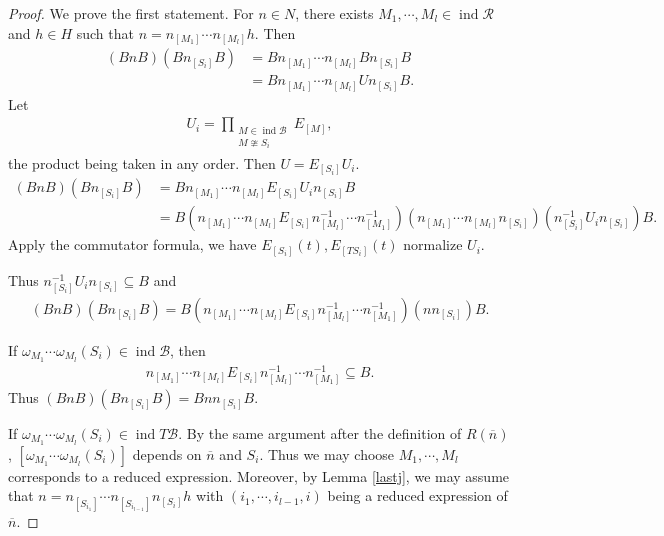 \documentclass[12pt]{amsart}
\begin{document}
\begin{proof}
    We prove the first statement.
    For $n\in N$, there exists $M_1,\cdots, M_l \in \operatorname{ind}\mathcal{R}$ and $h\in H$ such that $n=n_{[M_1]}\cdots n_{[M_l]}h$.
    Then 
    \begin{align*}
        (BnB)(Bn_{[S_i]}B) &= B n_{[M_1]}\cdots n_{[M_l]} Bn_{[S_i]}B \\
               &= Bn_{[M_1]}\cdots n_{[M_l]} U n_{[S_i]}B.
    \end{align*}
    Let 
    \begin{align*}
        U_i=\prod_{\substack{M \in \operatorname{ind}\mathcal{B} \\ M\ncong S_i}} E_{[M]} ,
    \end{align*}
  the product being taken in any order.
    Then $U=E_{[S_i]}U_i$.
    \begin{align*}
        (BnB)(Bn_{[S_i]}B) &= Bn_{[M_1]}\cdots n_{[M_l]} E_{[S_i]}U_i n_{[S_i]}B\\
         &= B(n_{[M_1]}\cdots n_{[M_l]}E_{[S_i]}n_{[M_l]}^{-1} \cdots n_{[M_1]}^{-1} )(n_{[M_1]}\cdots n_{[M_l]}n_{[S_i]})(n_{[S_i]}^{-1}U_i n_{[S_i]})B.
    \end{align*}
    Apply the commutator formula, we have $E_{[S_i]}(t),E_{[TS_i]}(t)$ normalize $U_i$.
    
    Thus $n_{[S_i]}^{-1} U_i n_{[S_i]}\subseteq  B$ and
    \begin{align*}
        (BnB)(Bn_{[S_i]}B) = B(n_{[M_1]}\cdots n_{[M_l]}E_{[S_i]}n_{[M_l]}^{-1} \cdots n_{[M_1]}^{-1} ) (nn_{[S_i]})B.
    \end{align*}
    
    If $\omega_{M_1}\cdots\omega_{M_l}(S_i)\in \operatorname{ind}\mathcal{B}$, then
    \begin{align*}
        n_{[M_1]}\cdots n_{[M_l]}E_{[S_i]}n_{[M_l]}^{-1} \cdots n_{[M_1]}^{-1}  \subseteq  B.
    \end{align*}
    Thus $(BnB)(Bn_{[S_i]}B) = Bnn_{[S_i]}B$.

    If $\omega_{M_1}\cdots\omega_{M_l}(S_i)\in \operatorname{ind}T\mathcal{B}$. 
    By the same argument after the definition of $R(\overline{n})$, $[\omega_{M_1}\cdots\omega_{M_l}(S_i)]$ depends on $\overline{n}$ and $S_i$.
    Thus we may choose $M_1,\cdots, M_l $ corresponds to a reduced expression.
    Moreover, by Lemma \ref{lastj}, we may assume that $n=n_{[S_{i_1}]}\cdots n_{[S_{i_{l-1}}]} n_{[S_i]}h$ with $(i_1,\cdots,i_{l-1},i)$ being a reduced expression of $\overline{n}$.


\end{proof}
\end{document}
